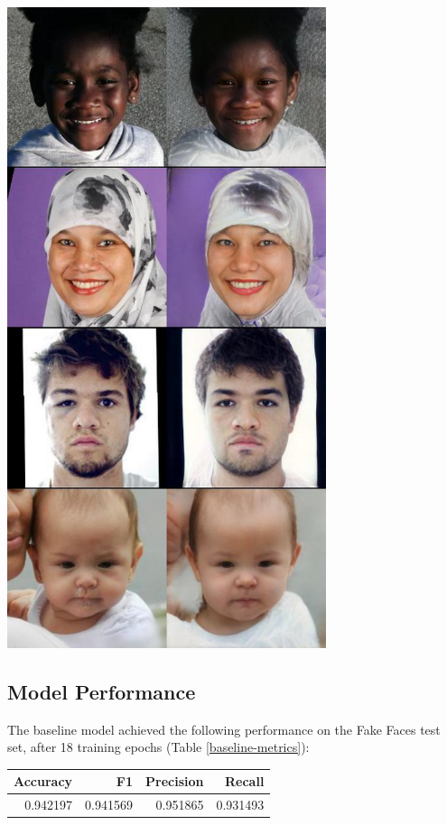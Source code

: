 \documentclass[11pt, letterpaper]{article}
\newenvironment{Figure}
  {\par\medskip\noindent\minipage{\linewidth}}
  {\endminipage\par\medskip}
\begin{document}
\begin{multicols}{2}
  \begin{Figure}
    \centering
    \includegraphics[width=0.7\textwidth]{figures/fair2fake.jpg}
    \label{fair2fake}
  \end{Figure}

  \subsection{Model Performance}

  The baseline model achieved the following performance on the Fake Faces test
  set, after 18 training epochs (Table \ref{baseline-metrics}):

  \begin{Figure}
    \label{baseline-metrics}
    \begin{tabular}{rrrr}
    \toprule
     Accuracy &        F1 &  Precision &    Recall \\
    \midrule
     0.942197 &  0.941569 &   0.951865 &  0.931493 \\
    \bottomrule
    \end{tabular}
  \end{Figure}


\end{multicols}
\end{document}

